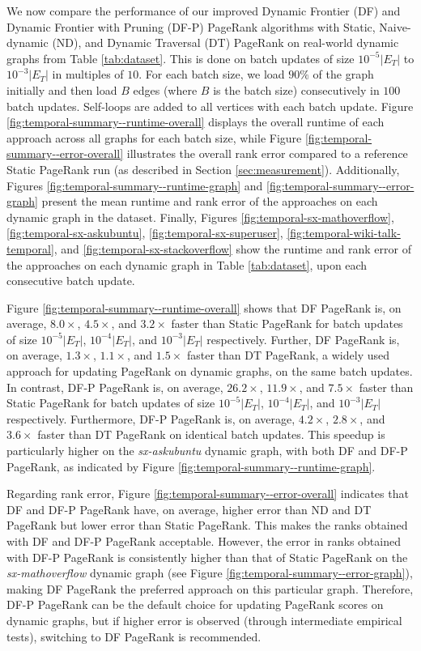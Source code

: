 We now compare the performance of our improved Dynamic Frontier (DF) and Dynamic Frontier with Pruning (DF-P) PageRank algorithms with Static, Naive-dynamic (ND), and Dynamic Traversal (DT) PageRank on real-world dynamic graphs from Table \ref{tab:dataset}. This is done on batch updates of size $10^{-5}|E_T|$ to $10^{-3}|E_T|$ in multiples of $10$. For each batch size, we load $90\%$ of the graph initially and then load $B$ edges (where $B$ is the batch size) consecutively in $100$ batch updates. Self-loops are added to all vertices with each batch update. Figure \ref{fig:temporal-summary--runtime-overall} displays the overall runtime of each approach across all graphs for each batch size, while Figure \ref{fig:temporal-summary--error-overall} illustrates the overall rank error compared to a reference Static PageRank run (as described in Section \ref{sec:measurement}). Additionally, Figures \ref{fig:temporal-summary--runtime-graph} and \ref{fig:temporal-summary--error-graph} present the mean runtime and rank error of the approaches on each dynamic graph in the dataset. Finally, Figures \ref{fig:temporal-sx-mathoverflow}, \ref{fig:temporal-sx-askubuntu}, \ref{fig:temporal-sx-superuser}, \ref{fig:temporal-wiki-talk-temporal}, and \ref{fig:temporal-sx-stackoverflow} show the runtime and rank error of the approaches on each dynamic graph in Table \ref{tab:dataset}, upon each consecutive batch update.

Figure \ref{fig:temporal-summary--runtime-overall} shows that DF PageRank is, on average, $8.0\times$, $4.5\times$, and $3.2\times$ faster than Static PageRank for batch updates of size $10^{-5}|E_T|$, $10^{-4}|E_T|$, and $10^{-3}|E_T|$ respectively. Further, DF PageRank is, on average, $1.3\times$, $1.1\times$, and $1.5\times$ faster than DT PageRank, a widely used approach for updating PageRank on dynamic graphs, on the same batch updates. In contrast, DF-P PageRank is, on average, $26.2\times$, $11.9\times$, and $7.5\times$ faster than Static PageRank for batch updates of size $10^{-5}|E_T|$, $10^{-4}|E_T|$, and $10^{-3}|E_T|$ respectively. Furthermore, DF-P PageRank is, on average, $4.2\times$, $2.8\times$, and $3.6\times$ faster than DT PageRank on identical batch updates. This speedup is particularly higher on the \textit{sx-askubuntu} dynamic graph, with both DF and DF-P PageRank, as indicated by Figure \ref{fig:temporal-summary--runtime-graph}.

Regarding rank error, Figure \ref{fig:temporal-summary--error-overall} indicates that DF and DF-P PageRank have, on average, higher error than ND and DT PageRank but lower error than Static PageRank. This makes the ranks obtained with DF and DF-P PageRank acceptable. However, the error in ranks obtained with DF-P PageRank is consistently higher than that of Static PageRank on the \textit{sx-mathoverflow} dynamic graph (see Figure \ref{fig:temporal-summary--error-graph}), making DF PageRank the preferred approach on this particular graph. Therefore, DF-P PageRank can be the default choice for updating PageRank scores on dynamic graphs, but if higher error is observed (through intermediate empirical tests), switching to DF PageRank is recommended.

